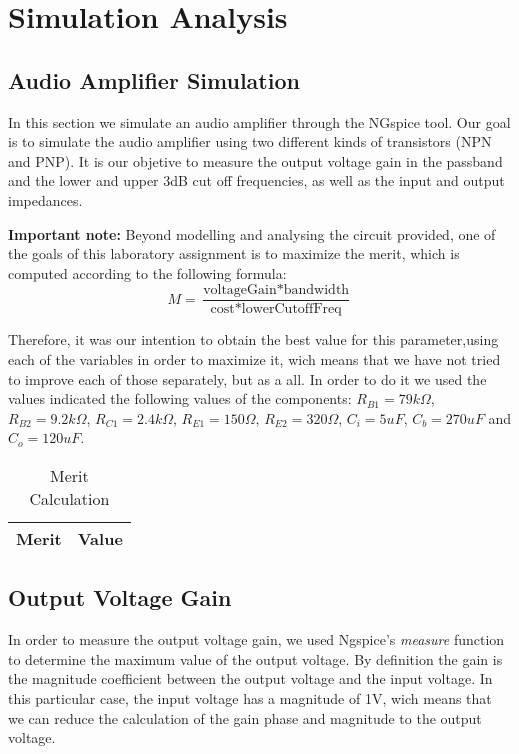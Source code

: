 \section{Simulation Analysis}
\label{sec:simulation}

\subsection{Audio Amplifier Simulation}
\label{subsec:amp_simulation}
\par In this section we simulate an audio amplifier through the NGspice tool. Our goal is to simulate the audio amplifier using two different kinds of transistors (NPN and PNP). It is our objetive to measure the output voltage gain in the passband and the lower and upper 3dB cut off frequencies, as well as the input and output impedances.

\par  \textbf{Important note:} Beyond modelling and analysing the circuit provided, one of the goals of this laboratory assignment is to maximize the merit, which is computed according to the following formula:
\begin{equation}
M = \frac{\text{voltageGain}*\text{bandwidth}}{\text{cost}*\text{lowerCutoffFreq}}
\end{equation}

Therefore, it was our intention to obtain the best value for this parameter,using each of the variables in order to maximize it, wich means that we have not tried to improve each of those separately, but as a all.
In order to do it we used the values indicated the following values of the components: $R_{B1}=79k\Omega$, $R_{B2}=9.2k\Omega$, $R_{C1}=2.4k\Omega$, $R_{E1}=150\Omega$, $R_{E2}=320\Omega$, $C_{i}=5uF$, $C_{b}=270uF$ and $C_{o}=120uF$.   
  

\begin{table}[H]
  \centering
  \begin{tabular}{ |l|r| } 
    \hline    
    {\bf Merit} & {\bf Value} \\ \hline
    
  \end{tabular}
  \caption{Merit Calculation}
  \label{tab:merit}
\end{table}

\subsection{Output Voltage Gain}
\label{output_gain}
\par In order to measure the output voltage gain, we used Ngspice's \textit{measure} function to determine the maximum value of the output voltage. By definition the gain is the magnitude coefficient between the output voltage and the input voltage. In this particular case, the input voltage has a magnitude of 1V, wich means that we can reduce the calculation of the gain phase and magnitude to the output voltage.

